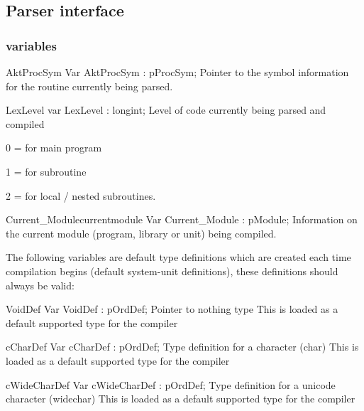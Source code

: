 \documentclass [a4paper,12pt]{article}
\begin{document}
\subsection{Parser interface}
\label{subsec:parser}

\subsubsection{variables}


\begin{variable}{AktProcSym}
\Declaration
Var AktProcSym : pProcSym;
\Description
Pointer to the symbol information for the routine currently being parsed.
\end{variable}

\begin{variable}{LexLevel}
\Declaration
var LexLevel : longint;
\Description
Level of code currently being parsed and compiled  \par 0 = for main program
\par 1 = for subroutine \par 2 = for local / nested subroutines.
\end{variable}

\begin{variablel}{Current{\_}Module}{currentmodule}
\Declaration
Var Current{\_}Module : pModule;
\Description
Information on the current module (program, library or unit) being compiled.
\end{variablel}

The following variables are default type definitions which are created each
time compilation begins (default system-unit definitions), these definitions
should always be valid:

\begin{variable}{VoidDef}
\Declaration
Var VoidDef : pOrdDef;
\Description
Pointer to nothing type
\Notes
This is loaded as a default supported type for the compiler
\end{variable}

\begin{variable}{cCharDef}
\Declaration
Var cCharDef : pOrdDef;
\Description
Type definition for a character (\textsf{char})
\Notes
This is loaded as a default supported type for the compiler
\end{variable}

\begin{variable}{cWideCharDef}
\Declaration
Var cWideCharDef : pOrdDef;
\Description
Type definition for a unicode character (\textsf{widechar})
\Notes
This is loaded as a default supported type for the compiler
\end{variable}
\end{document}
